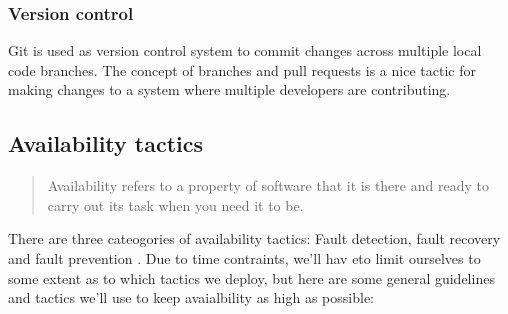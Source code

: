 \subsubsection{Version control}
Git is used as version control system to commit changes across multiple local code branches. The concept of branches and pull requests is a nice tactic for making changes to a system where multiple developers are contributing. 



\subsection{Availability tactics}\label{availability-tactics}
\begin{quote}
    Availability refers to a property of software that it is there and ready to carry out its task when you need it to be.~\cite{progark}
\end{quote}

There are three cateogories of availability tactics: Fault detection, fault recovery and fault prevention \cite{progark, 87}. Due to time contraints, we'll hav eto limit ourselves to some extent as to which tactics we deploy, but here are some general guidelines and tactics we'll use to keep avaialbility as high as possible:

